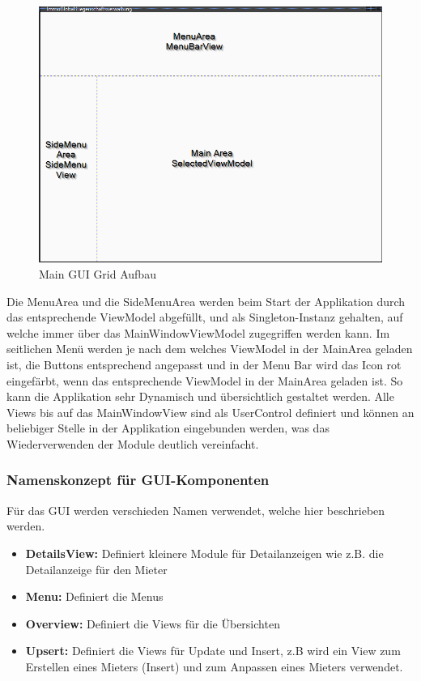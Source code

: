 \begin{figure}[H]
  \begin{center}
    \includegraphics[width=0.6\linewidth]{content/images/MainGuiGrid.png}
    \caption{Main GUI Grid Aufbau}
    \label{guiGrid}
  \end{center}
\end{figure}
Die MenuArea und die SideMenuArea werden beim Start der Applikation durch das entsprechende ViewModel abgefüllt, und als Singleton-Instanz gehalten, auf welche immer über das MainWindowViewModel zugegriffen werden kann. Im seitlichen Menü werden je nach dem welches ViewModel in der MainArea geladen ist, die Buttons entsprechend angepasst und in der Menu Bar wird das Icon rot eingefärbt, wenn das entsprechende ViewModel in der MainArea geladen ist. So kann die Applikation sehr Dynamisch und übersichtlich gestaltet werden.
Alle Views bis auf das MainWindowView sind als UserControl definiert und können an beliebiger Stelle in der Applikation eingebunden werden, was das Wiederverwenden der Module deutlich vereinfacht.

\subsubsection{Namenskonzept für GUI-Komponenten}
Für das GUI werden verschieden Namen verwendet, welche hier beschrieben werden.
\begin{itemize}
  \item \textbf{DetailsView:} Definiert kleinere Module für Detailanzeigen wie z.B. die Detailanzeige für den Mieter
  \item \textbf{Menu:} Definiert die Menus
  \item \textbf{Overview:} Definiert die Views für die Übersichten
  \item \textbf{Upsert:} Definiert die Views für Update und Insert, z.B wird ein View zum Erstellen eines Mieters (Insert) und zum Anpassen eines Mieters verwendet.
\end{itemize}

